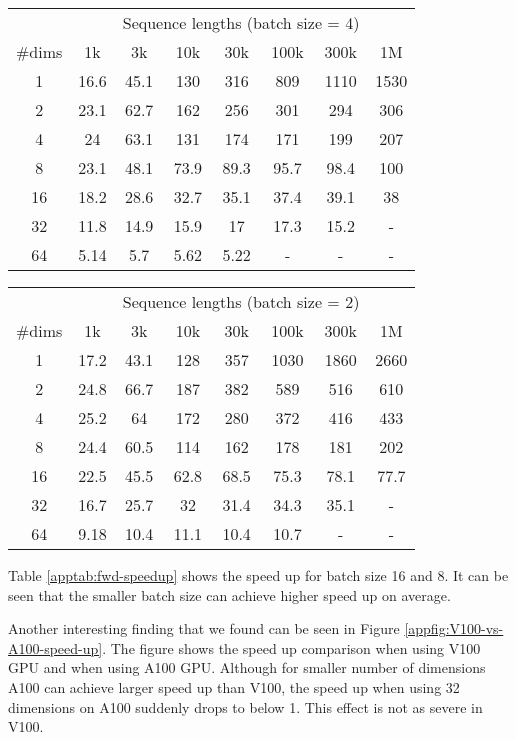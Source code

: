 \begin{table}
\begin{center}
\begin{tabular}{|c|ccccccc|}
\hline
~ & ~ & \multicolumn{5}{c}{Sequence lengths (batch size = 4)} & ~ \\
\#dims & 1k & 3k & 10k & 30k & 100k & 300k & 1M \\
\hline
1 & 16.6 & 45.1 & 130 & 316 & 809 & 1110 & 1530 \\
2 & 23.1 & 62.7 & 162 & 256 & 301 & 294 & 306 \\
4 & 24 & 63.1 & 131 & 174 & 171 & 199 & 207 \\
8 & 23.1 & 48.1 & 73.9 & 89.3 & 95.7 & 98.4 & 100 \\
16 & 18.2 & 28.6 & 32.7 & 35.1 & 37.4 & 39.1 & 38 \\
32 & 11.8 & 14.9 & 15.9 & 17 & 17.3 & 15.2 & - \\
64 & 5.14 & 5.7 & 5.62 & 5.22 & - & - & - \\
\hline
\end{tabular}

\begin{tabular}{|c|ccccccc|}
\hline
~ & ~ & \multicolumn{5}{c}{Sequence lengths (batch size = 2)} & ~ \\
\#dims & 1k & 3k & 10k & 30k & 100k & 300k & 1M \\
\hline
1 & 17.2 & 43.1 & 128 & 357 & 1030 & 1860 & 2660 \\
2 & 24.8 & 66.7 & 187 & 382 & 589 & 516 & 610 \\
4 & 25.2 & 64 & 172 & 280 & 372 & 416 & 433 \\
8 & 24.4 & 60.5 & 114 & 162 & 178 & 181 & 202 \\
16 & 22.5 & 45.5 & 62.8 & 68.5 & 75.3 & 78.1 & 77.7 \\
32 & 16.7 & 25.7 & 32 & 31.4 & 34.3 & 35.1 & - \\
64 & 9.18 & 10.4 & 11.1 & 10.4 & 10.7 & - & - \\
\hline
\end{tabular}



\end{center}
\end{table}

Table \ref{apptab:fwd-speedup} shows the speed up for batch size 16 and 8.
It can be seen that the smaller batch size can achieve higher speed up on average.

Another interesting finding that we found can be seen in Figure \ref{appfig:V100-vs-A100-speed-up}.
The figure shows the speed up comparison when using V100 GPU and when using A100 GPU.
Although for smaller number of dimensions A100 can achieve larger speed up than V100, the speed up when using 32 dimensions on A100 suddenly drops to below 1.
This effect is not as severe in V100.

